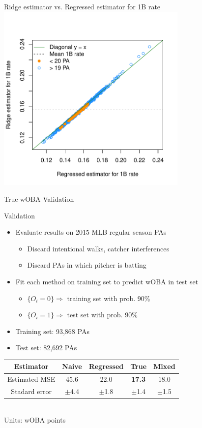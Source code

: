 \documentclass{beamer}
\begin{document}
\begin{frame}{Ridge estimator vs. Regressed estimator for 1B rate}
\centering
\includegraphics[width = 0.7\textwidth]{../figs/regul-as-regre-c.pdf}
\end{frame}

\begin{frame}
\centering\LARGE True wOBA Validation
\end{frame}

\begin{frame}{Validation}
\begin{itemize}
\item Evaluate results on 2015 MLB regular season PAs
\begin{itemize}
    \item Discard intentional walks, catcher interferences
    \item Discard PAs in which pitcher is batting
\end{itemize}
\item Fit each method on training set to predict wOBA in test set
\begin{itemize}
    \item $\{O_i = 0\} \Rightarrow$ training set with prob. 90\%
    \item $\{O_i = 1\} \Rightarrow$ test set with prob. 90\%
\end{itemize}
\item Training set: 93,868 PAs
\item Test set: 82,692 PAs
\end{itemize}
\begin{center}
\begin{tabular}{c|cccc}
Estimator           &  Naive    & Regressed & True          & Mixed\\
\hline
Estimated MSE      & 45.6   & 22.0   & {\bf 17.3} & 18.0\\
Stadard error       &$\pm$4.4&$\pm$1.8&$\pm$1.4 &$\pm$1.5
\end{tabular}\\
{\scriptsize Units: wOBA points}
\end{center}
\end{frame}
\end{document}
